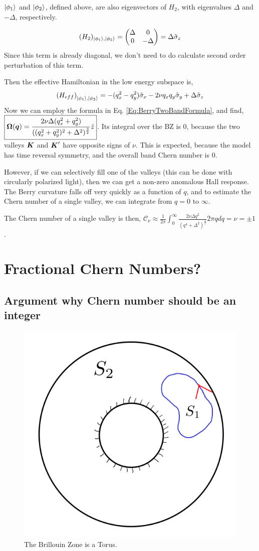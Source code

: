 \documentclass{report}
\renewcommand\vec[1]{\ensuremath\boldsymbol{#1}} %
\begin{document}
$\ket{\phi_1}$ and $\ket{\phi_2}$, defined above, are also eigenvectors of $H_2$, with eigenvalues $\Delta$ and $-\Delta$, respectively.

$$ (H_2)_{\ket{\phi_1}, \ket{\phi_2}} = \begin{pmatrix}
	\Delta & 0 \\
	0 & -\Delta
\end{pmatrix} = \Delta \tilde{\sigma}_z
$$
Since this term is already diagonal, we don't need to do calculate second order perturbation of this term.

Then the effective Hamiltonian in the low energy subspace is,
\begin{equation}\label{Eq:EffectiveHamiltonian}
	\left(H_{eff}\right)_{\ket{\phi_1}, \ket{\phi_2}} = -(q_x^2 - q_y^2) \tilde{\sigma}_x - 2 \nu q_x q_y \tilde{\sigma}_y + \Delta \tilde{\sigma}_z 
\end{equation}
Now we can employ the formula in Eq. \ref{Eq:BerryTwoBandFormula}, and find, $\boxed{\vec{\Omega}(\vec{q}) = \frac{2 \nu \Delta (q_x^2 + q_y^2)}{((q_x^2 + q_y^2)^2 + \Delta^2)^{\frac{3}{2}}}    \hat{z}}$.
Its integral over the BZ is 0, because the two valleys $\vec{K}$ and $\vec{K}'$ have opposite signs of $\nu$. This is expected, because the model has time reversal symmetry, and the overall band Chern number is 0.

However, if we can selectively fill one of the valleys (this can be done with circularly polarized light), then we can get a non-zero anomalous Hall response. The Berry curvature falls off very quickly as a function of $q$, and to estimate the Chern number of a single valley, we can integrate from $q = 0$ to $\infty$.

The Chern number of a single valley is then, $\boxed{\mathcal{C}_{\nu} \approx \frac{1}{2\pi} \int_0^{\infty} \frac{2 \nu \Delta q^2}{(q^4 + \Delta^2)^{\frac{3}{2}}} 2 \pi q dq = \nu = \pm 1}$.

\section{Fractional Chern Numbers?}
\subsection{Argument why Chern number should be an integer}\label{sebsec:integer-chern-argument}

\begin{figure}[h!]
	\centering
	\includegraphics[width=0.4\linewidth]{torus}
	\caption{The Brillouin Zone is a Torus.}
	\label{fig:torus}
\end{figure}
\end{document}
